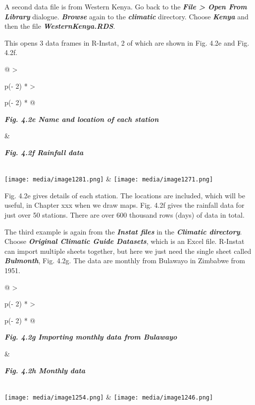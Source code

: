 \documentclass[
  letterpaper,
  DIV=11,
  numbers=noendperiod]{scrreprt}
\begin{document}
A second data file is from Western Kenya. Go back to the
\textbf{\emph{File \textgreater{} Open From Library}} dialogue.
\textbf{\emph{Browse}} again to the \textbf{\emph{climatic}} directory.
Choose \textbf{\emph{Kenya}} and then the file
\textbf{\emph{WesternKenya.RDS}}.

This opens 3 data frames in R-Instat, 2 of which are shown in Fig. 4.2e
and Fig. 4.2f.

\begin{longtable}[]{@{}
  >{\raggedright\arraybackslash}p{(\columnwidth - 2\tabcolsep) * }
  >{\raggedright\arraybackslash}p{(\columnwidth - 2\tabcolsep) * }@{}}
\toprule\noalign{}
\begin{minipage}[b]{\linewidth}\raggedright
\textbf{\emph{Fig. 4.2e Name and location of each station}}
\end{minipage} & \begin{minipage}[b]{\linewidth}\raggedright
\textbf{\emph{Fig. 4.2f Rainfall data}}
\end{minipage} \\
\midrule\noalign{}
\endhead
\bottomrule\noalign{}
\endlastfoot
\texttt{[image: media/image1281.png]}
&
\texttt{[image: media/image1271.png]} \\
\end{longtable}

Fig. 4.2e gives details of each station. The locations are included,
which will be useful, in Chapter xxx when we draw maps. Fig. 4.2f gives
the rainfall data for just over 50 stations. There are over 600 thousand
rows (days) of data in total.

The third example is again from the \textbf{\emph{Instat files}} in the
\textbf{\emph{Climatic directory}}. Choose \textbf{\emph{Original
Climatic Guide Datasets}}, which is an Excel file. R-Instat can import
multiple sheets together, but here we just need the single sheet called
\textbf{\emph{Bulmonth}}, Fig. 4.2g. The data are monthly from Bulawayo
in Zimbabwe from 1951.

\begin{longtable}[]{@{}
  >{\raggedright\arraybackslash}p{(\columnwidth - 2\tabcolsep) * }
  >{\raggedright\arraybackslash}p{(\columnwidth - 2\tabcolsep) * }@{}}
\toprule\noalign{}
\begin{minipage}[b]{\linewidth}\raggedright
\textbf{\emph{Fig. 4.2g Importing monthly data from Bulawayo}}
\end{minipage} & \begin{minipage}[b]{\linewidth}\raggedright
\textbf{\emph{Fig. 4.2h Monthly data}}
\end{minipage} \\
\midrule\noalign{}
\endhead
\bottomrule\noalign{}
\endlastfoot
\texttt{[image: media/image1254.png]}
&
\texttt{[image: media/image1246.png]} \\
\end{longtable}
\end{document}
